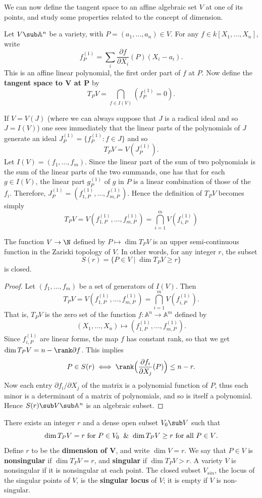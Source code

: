 We can now define the tangent space to an affine algebraic set $V$ at one of its points, and study some properties related to the concept of dimension.
\begin{definition}
Let $V\sub\mathbb{A}^n$ be a variety, with $P=(a_1,\dots,a_n)\in V$. For any $f\in k[X_1,\dots,X_n]$, write
\[f^{(1)}_P=\sum_i\frac{\partial f}{\partial X_i}(P)(X_i-a_i).\]
This is an affine linear polynomial, the first order part of $f$ at $P$. Now define the \textbf{tangent space to $\bm{V}$ at $\bm{P}$} by
\[T_PV=\bigcap_{f\in I(V)}(f_P^{(1)}=0).\]
\end{definition}
If $V=V(J)$ (where we can always suppose that $J$ is a radical ideal and so $J=I(V)$) one sees immediately that the linear parts of the polynomials of $J$ generate an ideal $J_P^{(1)}=\{f_P^{(1)}:f\in J\}$ and so
\[T_PV=V(J^{(1)}_P).\]
Let $I(V)=(f_1,\dots,f_m)$. Since the linear part of the sum of two polynomials is the sum of the linear parts of the two summands, one has that for each $g\in I(V)$, the linear part $g^{(1)}_P$ of $g$ in $P$ is a linear combination of those of the $f_i$. Therefore, $J^{(1)}_P=(f_{1,P}^{(1)},\dots,f^{(1)}_{m,P})$. Hence the definition of $T_PV$ becomes simply
\[T_PV=V(f_{1,P}^{(1)},\dots,f^{(1)}_{m,P})=\bigcap_{i=1}^{m}V(f^{(1)}_{i,P})\]
\begin{proposition}
The function $V\to\N$ defined by $P\mapsto\dim T_PV$ is an upper semi-continuous function in the Zariski topology of $V$. In other words, for any integer $r$, the subset
\[S(r)=\{P\in V\mid\dim T_PV\geq r\}\]
is closed.
\end{proposition}
\begin{proof}
Let $(f_1,\dots,f_m)$ be a set of generators of $I(V)$. Then
\[T_PV=V(f_{1,P}^{(1)},\dots,f^{(1)}_{m,P})=\bigcap_{i=1}^{m}V(f^{(1)}_{i,P}).\]
That is, $T_PV$ is the zero set of the function $f:\mathbb{A}^n\to\mathbb{A}^m$ defined by
\[(X_1,\dots,X_n)\mapsto(f^{(1)}_{1,P},\dots,f^{(1)}_{m,P}).\]
Since $f^{(1)}_{i,P}$ are linear forms, the map $f$ has constant rank, so that we get $\dim T_PV=n-\rank\partial f$. This implies
\[P\in S(r)\iff\rank\Big(\frac{\partial f_i}{\partial X_j}(P)\Big)\leq n-r.\]
Now each entry $\partial f_i/\partial X_j$ of the matrix is a polynomial function of $P$, thus each minor is a determinant of a matrix of polynomials, and so is itself a polynomial. Hence $S(r)\sub V\sub\mathbb{A}^n$ is an algebraic subset.
\end{proof}
\begin{corollary}
There exists an integer $r$ and a dense open subset $V_0\sub V$ such that
\[\dim T_PV=r\text{ for }P\in V_0\And \dim T_PV\geq r\text{ for all $P\in V$}.\]
Define $r$ to be the \textbf{dimension of $\bm{V}$}, and write $\dim V=r$. We say that $P\in V$ is \textbf{nonsingular} if $\dim T_PV=r$, and \textbf{singular} if $\dim T_PV>r$. A variety $V$ is nonsingular if it is nonsingular at each point. The closed subset $V_{sin}$, the locus of the singular points of $V$, is the \textbf{singular locus} of $V$; it is empty if $V$ is non-singular.
\end{corollary}
